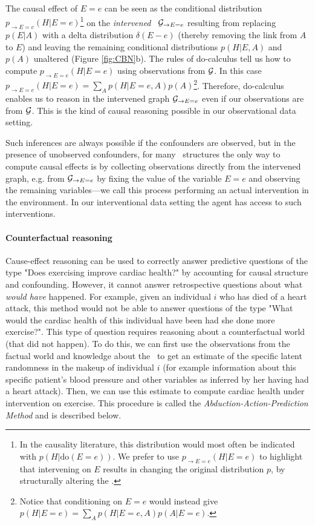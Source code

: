 The causal effect of $E=e$ can be seen as the conditional distribution $p_{\rightarrow E=e}(H|E=e)$\footnote{In the causality literature, this distribution would most often be indicated with $p(H|\textrm{do}(E=e))$. We prefer to use $p_{\rightarrow E=e}(H|E=e)$ to highlight that intervening on $E$ results in changing the original distribution $p$, by structurally altering the \CBN.} on the \emph{intervened} \CBN~${\cal G}_{\rightarrow E=e}$ resulting from replacing $p(E|A)$ with a delta distribution $\delta(E-e)$ (thereby removing the link from $A$ to $E$) and leaving the remaining conditional distributions $p(H|E,A)$ and $p(A)$ unaltered (Figure \ref{fig:CBN}b).
The rules of do-calculus \citep{pearl2000,pearl16causal} tell us how to compute $p_{\rightarrow E=e}(H|E=e)$ using observations from ${\cal G}$. In this case $p_{\rightarrow E=e}(H|E=e) = \sum_A p(H|E=e,A)p(A)$\footnote{Notice that conditioning on $E = e$ would instead give $p(H|E=e)=\sum_{A}p(H|E=e,A)p(A|E=e)$.}.
Therefore, do-calculus enables us to reason in the intervened graph ${\cal G}_{\rightarrow E=e}$ even if our observations are from ${\cal G}$. This is the kind of causal reasoning possible in our observational data setting.

Such inferences are always possible if the confounders are observed, but in the presence of unobserved confounders, for many \CBN~structures the only way to compute causal effects is by collecting observations directly from the intervened graph, e.g. from ${\cal G}_{\rightarrow E=e}$ by fixing the value of the variable $E=e$ and observing the remaining variables---we call this process performing an actual intervention in the environment. In our interventional data setting the agent has access to such interventions. 

\paragraph{Counterfactual reasoning}

Cause-effect reasoning can be used to correctly answer predictive questions of the type "Does exercising improve cardiac health?" by accounting for causal structure and confounding. However, it cannot answer retrospective questions about what \textit{would have} happened. For example, given an individual $i$ who has died of a heart attack, this method would not be able to answer questions of the type "What would the cardiac health of this individual have been had she done more exercise?". This type of question requires
reasoning about a counterfactual world (that did not happen). To do this, we can first use the observations from the factual world and knowledge about the \CBN~to get an estimate of the specific latent randomness in the makeup of individual $i$ (for example information about this specific patient's blood pressure and other variables as inferred by her having had a heart attack). Then, we can use this estimate to compute cardiac health under intervention on exercise. This procedure is called the \textit{Abduction-Action-Prediction Method} \cite{pearl16causal} and is described below.

